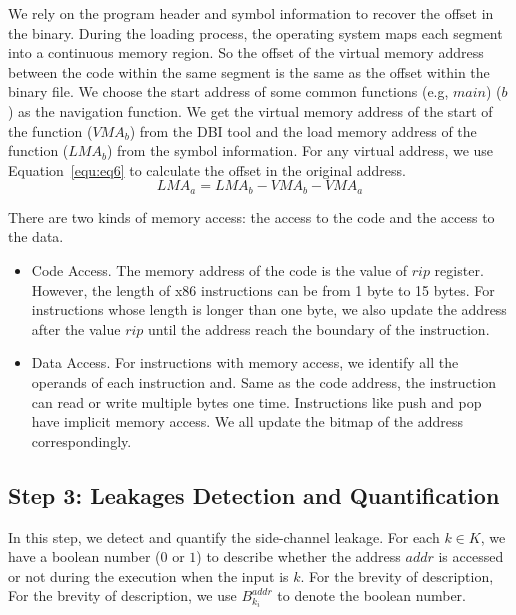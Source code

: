We rely on the program header and symbol information to recover the offset in the binary. During the loading process, the operating system maps each segment into a continuous memory region. So the offset of the virtual memory address between the code within the same segment is the same as the offset within the binary file. We choose the start address of some common functions (e.g, $main$) ($b$) as the navigation function. We get the virtual memory address of the start of the function ($\mathit{VMA_b}$) from the DBI tool and the load memory address of the function ($\mathit{LMA_b}$) from the symbol information. For any virtual address, we use Equation~\ref{equ:eq6} to calculate the offset in the original address.
\begin{equation}\label{equ:eq6}
    \mathit{LMA_a} = \mathit{LMA_b} - VMA_b - VMA_a
\end{equation}

There are two kinds of memory access: the access to the code and the access to the data. 
\begin{itemize}
\item Code Access. The memory address of the code is the value of $rip$ register. However, the length of x86 instructions can be from 1 byte to 15 bytes. For instructions whose length is longer than one byte, we also update the address  after the value $rip$ until the address reach the boundary of the instruction.
\item Data Access. For instructions with memory access, we identify all the operands of each instruction and. Same as the code address, the instruction can read or write multiple bytes one time.  Instructions like \textsf{push} and \textsf{pop} have implicit memory access. We all update the bitmap of the address correspondingly.
\end{itemize}

\subsection{Step 3: Leakages Detection and Quantification}
In this step, we detect and quantify the side-channel leakage. For each $k \in K$, we have a boolean number ($0$ or $1$) to describe whether the address $addr$ is accessed or not during the execution when the input is $k$. For the brevity of description, For the brevity of description, we use $B^{addr}_{k_i}$ to denote the boolean number. 



